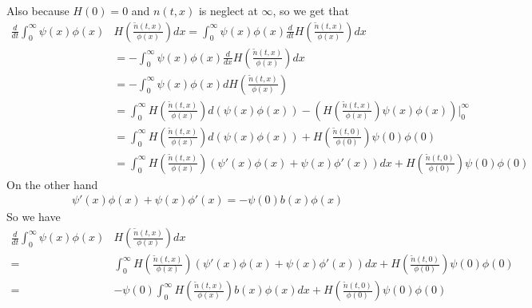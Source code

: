 \documentclass[pdf]{article}
\begin{document}
\begin{itemize}
Also because $H(0)=0$ and $n(t,x)$ is neglect at $\infty$, so we get that
\begin{align*}
\frac{d}{dt}\int_0^\infty\psi(x)\phi(x)&H\left(\frac{\tilde{n}(t,x)}{\phi(x)}\right)dx = \int_0^\infty\psi(x)\phi(x)\frac{d}{dt}H\left(\frac{\tilde{n}(t,x)}{\phi(x)}\right)dx\\
                                                                                                                                     &= -\int_0^\infty\psi(x)\phi(x)\frac{d}{dx}H\left(\frac{\tilde{n}(t,x)}{\phi(x)}\right)dx\\
                                                                                                                                     &= -\int_0^\infty\psi(x)\phi(x)dH\left(\frac{\tilde{n}(t,x)}{\phi(x)}\right)\\
                                                                                                                                     &= \int_0^\infty H\left(\frac{\tilde{n}(t,x)}{\phi(x)}\right)d(\psi(x)\phi(x)) - \left(H\left(\frac{\tilde{n}(t,x)}{\phi(x)}\right)\psi(x)\phi(x)\right)|_0^\infty\\
                                                                                                                                     &= \int_0^\infty H\left(\frac{\tilde{n}(t,x)}{\phi(x)}\right)d(\psi(x)\phi(x)) + H\left(\frac{\tilde{n}(t,0)}{\phi(0)}\right)\psi(0)\phi(0)\\
                                                                                                                                     &= \int_0^\infty H\left(\frac{\tilde{n}(t,x)}{\phi(x)}\right)(\psi'(x)\phi(x)+\psi(x)\phi'(x))dx + H\left(\frac{\tilde{n}(t,0)}{\phi(0)}\right)\psi(0)\phi(0)
\end{align*}
On the other hand 
\begin{align*}
\psi'(x)\phi(x)+\psi(x)\phi'(x) = -\psi(0)b(x)\phi(x)
\end{align*}
So we have
\begin{align*}
\frac{d}{dt}\int_0^\infty\psi(x)\phi(x)&H\left(\frac{\tilde{n}(t,x)}{\phi(x)}\right)dx \\
                                                                                                                                     = & \int_0^\infty H\left(\frac{\tilde{n}(t,x)}{\phi(x)}\right)(\psi'(x)\phi(x)+\psi(x)\phi'(x))dx + H\left(\frac{\tilde{n}(t,0)}{\phi(0)}\right)\psi(0)\phi(0)\\
                                                                                                                                     = &-\psi(0)\int_0^\infty H\left(\frac{\tilde{n}(t,x)}{\phi(x)}\right)b(x)\phi(x)dx + H\left(\frac{\tilde{n}(t,0)}{\phi(0)}\right)\psi(0)\phi(0)

\end{align*}
\end{itemize}
\end{document}
